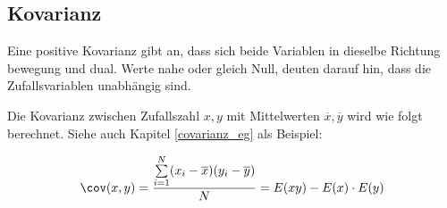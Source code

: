 \subsection{Kovarianz}
Eine positive Kovarianz gibt an, dass sich beide Variablen in dieselbe Richtung bewegung und dual. Werte nahe oder gleich Null, deuten darauf hin, dass die Zufallsvariablen unabhängig sind.

Die Kovarianz zwischen Zufallszahl $x,y$ mit Mittelwerten $\overline{x}, \overline{y}$ wird wie folgt berechnet. Siehe auch Kapitel \ref{covarianz_eg} als Beispiel:

\[
\cov(x,y) = \frac{\sum\limits_{i=1}^{N}(x_i - \overline{x})(y_i - \overline{y})}{N} = E(xy) - E(x)\cdot E(y)
\]

